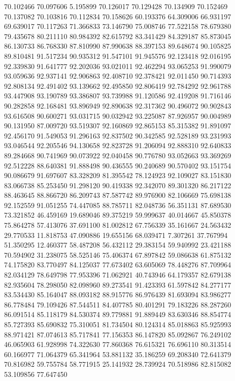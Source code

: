 70.102466
70.097606
5.195899
70.126017
70.129428
70.134909
70.152469
70.137082
70.103816
70.112834
70.158626
60.193376
64.309006
66.931197
69.639017
70.117263
71.366833
73.146790
75.008746
77.522158
78.679380
79.435678
80.211110
80.984392
82.615792
83.341429
84.329187
85.873045
86.130733
86.768330
87.810990
87.990638
88.397153
89.648674
90.105825
89.810481
91.517234
90.935312
91.547101
91.945576
92.123418
92.016195
92.339830
91.641777
92.202036
93.021011
92.462294
93.065253
91.990079
93.059636
92.937141
92.906863
92.408710
92.378421
92.011450
90.714393
92.808134
92.491402
93.139662
92.495850
92.806419
92.784292
92.961788
93.447908
93.190789
93.386807
93.739988
91.120586
92.419208
91.716146
90.282858
92.168481
93.896949
92.890638
92.317362
90.496072
90.902843
93.616508
90.600271
93.031715
90.032942
93.225087
87.926957
90.004989
90.131950
87.009720
93.519307
92.160869
92.865153
85.315382
91.891097
92.456170
91.549053
91.296163
92.837502
90.342585
92.528189
93.231993
93.046544
92.205546
94.130658
92.823728
91.206094
92.888310
92.640833
89.284668
90.741969
90.073922
92.040458
90.776780
93.052663
93.369269
92.512228
88.640381
91.888498
90.436555
90.240689
90.570402
93.151754
90.086679
91.697607
83.328209
81.395542
78.124923
92.109027
83.151830
83.066738
85.253450
91.298120
90.419338
92.342070
89.301320
86.217122
88.463645
88.866720
86.209743
87.587742
89.976900
82.106669
75.698138
92.152559
91.051255
74.447085
88.785711
82.048736
56.351131
87.689530
73.321852
46.459169
19.689046
89.375219
59.999637
40.014667
45.850378
75.864278
57.413076
37.691100
81.002812
67.756339
35.161667
24.563432
29.770533
11.818753
47.090886
19.655156
68.039471
7.307261
37.767994
51.350295
12.460377
58.487208
56.432112
29.383154
59.940992
23.421188
70.594902
31.238075
58.525146
75.406374
67.897842
59.086638
61.875132
74.175820
83.770497
84.125037
77.673402
63.605069
78.448276
87.709964
82.034129
78.649798
77.953396
71.062921
40.743946
64.179357
82.679138
82.935604
78.298050
82.098960
89.273541
91.423393
61.597842
84.277177
83.534430
85.164047
88.093182
88.915776
86.976439
81.693094
83.986277
86.778484
79.109426
87.544511
84.407785
80.401291
79.183226
88.287260
86.091514
85.118179
84.530374
89.779881
91.889449
83.630346
88.854774
85.727393
85.690832
75.310051
81.734504
80.124314
85.018863
85.925993
88.971421
87.074613
85.717841
77.156353
86.147820
85.092867
76.249102
46.065903
61.928998
74.322630
77.860368
76.615321
76.696110
80.313514
60.166977
71.064379
65.341964
53.881132
35.186259
69.208340
72.641379
70.816982
59.755784
58.771915
25.141932
28.739924
70.518986
82.815082
53.109856
77.647450
